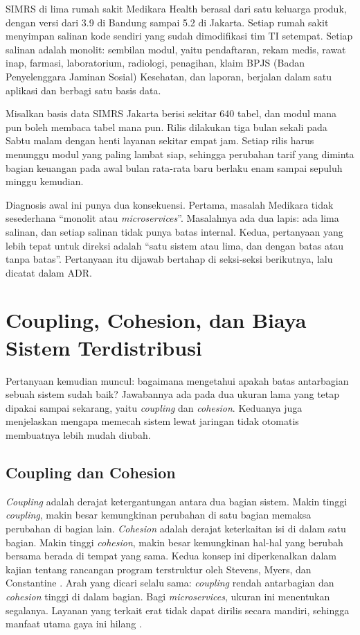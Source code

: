 \begin{kasus}[title={Kasus Medikara Health: SIMRS Monolitik sebagai Titik Awal}]
  SIMRS di lima rumah sakit Medikara Health berasal dari satu keluarga produk, dengan versi dari 3.9
  di Bandung sampai 5.2 di Jakarta. Setiap rumah sakit menyimpan salinan kode sendiri yang sudah
  dimodifikasi tim TI setempat. Setiap salinan adalah monolit: sembilan modul, yaitu pendaftaran,
  rekam medis, rawat inap, farmasi, laboratorium, radiologi, penagihan, klaim BPJS (Badan
  Penyelenggara Jaminan Sosial) Kesehatan, dan laporan, berjalan dalam satu aplikasi dan berbagi
  satu basis data.

  Misalkan basis data SIMRS Jakarta berisi sekitar 640 tabel, dan modul mana pun boleh membaca
  tabel mana pun. Rilis dilakukan tiga bulan sekali pada Sabtu malam dengan henti layanan sekitar
  empat jam. Setiap rilis harus menunggu modul yang paling lambat siap, sehingga perubahan tarif
  yang diminta bagian keuangan pada awal bulan rata-rata baru berlaku enam sampai sepuluh minggu
  kemudian.

  Diagnosis awal ini punya dua konsekuensi. Pertama, masalah Medikara tidak sesederhana ``monolit
  atau \textit{microservices}''. Masalahnya ada dua lapis: ada lima salinan, dan setiap salinan
  tidak punya batas internal. Kedua, pertanyaan yang lebih tepat untuk direksi adalah ``satu sistem
  atau lima, dan dengan batas atau tanpa batas''. Pertanyaan itu dijawab bertahap di seksi-seksi
  berikutnya, lalu dicatat dalam ADR.
\end{kasus}

\section{Coupling, Cohesion, dan Biaya Sistem Terdistribusi}
\label{sec:ch07-coupling}

Pertanyaan kemudian muncul: bagaimana mengetahui apakah batas antarbagian sebuah sistem sudah baik?
Jawabannya ada pada dua ukuran lama yang tetap dipakai sampai sekarang, yaitu \textit{coupling} dan
\textit{cohesion}. Keduanya juga menjelaskan mengapa memecah sistem lewat jaringan tidak otomatis
membuatnya lebih mudah diubah.

\subsection{Coupling dan Cohesion}

\textit{Coupling} adalah derajat ketergantungan antara dua bagian sistem. Makin tinggi
\textit{coupling}, makin besar kemungkinan perubahan di satu bagian memaksa perubahan di bagian
lain. \textit{Cohesion} adalah derajat keterkaitan isi di dalam satu bagian. Makin tinggi
\textit{cohesion}, makin besar kemungkinan hal-hal yang berubah bersama berada di tempat yang sama.
Kedua konsep ini diperkenalkan dalam kajian tentang rancangan program terstruktur oleh Stevens, Myers,
dan Constantine \cite{c07-stevens1974}. Arah yang dicari selalu sama: \textit{coupling} rendah
antarbagian dan \textit{cohesion} tinggi di dalam bagian. Bagi \textit{microservices}, ukuran ini
menentukan segalanya. Layanan yang terkait erat tidak dapat dirilis secara mandiri, sehingga
manfaat utama gaya ini hilang \cite{newman2021}.

